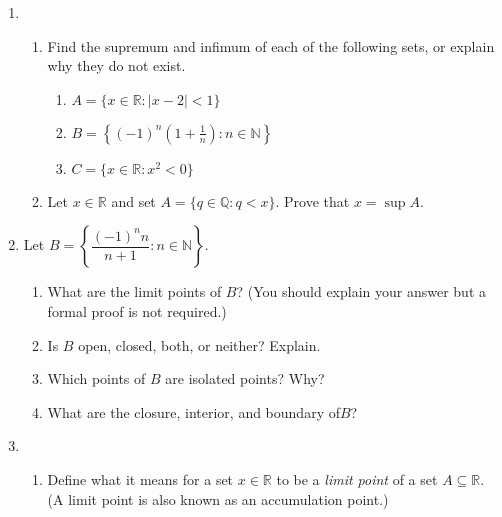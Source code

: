 \documentclass[12pt]{article}
\newcommand{\points}[1]{\marginpar{\hspace{24pt}[#1]}}
\newcommand{\R}{\mathbb{R}}
\newcommand{\Q}{\mathbb{Q}}
\newcommand{\N}{\mathbb{N}}
\newcommand{\abs}[1]{\lvert #1\rvert}
\begin{document}
\begin{enumerate}
\item \begin{enumerate}
       \item Find the supremum and infimum of each of the following sets, or explain why they do not exist. 
\begin{enumerate}
\item $A = \{x\in\R : \abs{x-2}<1\}$ \points{2}

\vspace{2.75in}

\item $B = \left\{(-1)^n\left(1+\frac{1}{n}\right) : n\in\N\right\}$ \points{2}

\vspace{2.75in}

\item $C = \{x\in \R : x^2<0\}$ \points{2}
\end{enumerate}
\newpage
\item Let $x\in\R$ and set $A = \{q\in\Q : q<x\}$. Prove that $x=\sup A$. \points{4}
      \end{enumerate}
\newpage
\item Let $B = \left\{\dfrac{(-1)^nn}{n+1} : n\in\N\right\}$.
\begin{enumerate}
       \item What are the limit points of $B$? (You should explain your answer but a formal proof is not required.)\points{3}

\vspace{4.5in}

      \item Is $B$ open, closed, both, or neither? Explain.\points{2}

\newpage

      \item Which points of $B$ are isolated points? Why? \points{2}

\vspace{4in}

      \item What are the closure, interior, and boundary of$B$? \points{3}

\end{enumerate}
\newpage
\item \begin{enumerate}
       \item Define what it means for a set $x\in\R$ to be a {\em limit point} of a set $A\subseteq \R$. (A limit point is also known as an accumulation point.) \points{3}


\end{enumerate}
\end{enumerate}
\end{document}
